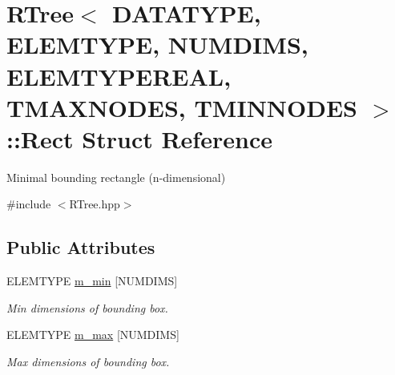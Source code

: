 \hypertarget{struct_r_tree_1_1_rect}{\section{\-R\-Tree$<$ \-D\-A\-T\-A\-T\-Y\-P\-E, \-E\-L\-E\-M\-T\-Y\-P\-E, \-N\-U\-M\-D\-I\-M\-S, \-E\-L\-E\-M\-T\-Y\-P\-E\-R\-E\-A\-L, \-T\-M\-A\-X\-N\-O\-D\-E\-S, \-T\-M\-I\-N\-N\-O\-D\-E\-S $>$\-:\-:\-Rect \-Struct \-Reference}
\label{struct_r_tree_1_1_rect}
}


\-Minimal bounding rectangle (n-\/dimensional)  




{\ttfamily \#include $<$\-R\-Tree.\-hpp$>$}

\subsection*{\-Public \-Attributes}
\begin{DoxyCompactItemize}
\item 
\hypertarget{struct_r_tree_1_1_rect_a2b5b254493aba27b30fe6fc8df151ed5}{\-E\-L\-E\-M\-T\-Y\-P\-E \hyperlink{struct_r_tree_1_1_rect_a2b5b254493aba27b30fe6fc8df151ed5}{m\-\_\-min} \mbox{[}\-N\-U\-M\-D\-I\-M\-S\mbox{]}}\label{struct_r_tree_1_1_rect_a2b5b254493aba27b30fe6fc8df151ed5}

\begin{DoxyCompactList}\small\item\em \-Min dimensions of bounding box. \end{DoxyCompactList}\item 
\hypertarget{struct_r_tree_1_1_rect_a6570c2a5a16b19b0d08cd1eaa224961b}{\-E\-L\-E\-M\-T\-Y\-P\-E \hyperlink{struct_r_tree_1_1_rect_a6570c2a5a16b19b0d08cd1eaa224961b}{m\-\_\-max} \mbox{[}\-N\-U\-M\-D\-I\-M\-S\mbox{]}}\label{struct_r_tree_1_1_rect_a6570c2a5a16b19b0d08cd1eaa224961b}

\begin{DoxyCompactList}\small\item\em \-Max dimensions of bounding box. \end{DoxyCompactList}\end{DoxyCompactItemize}


